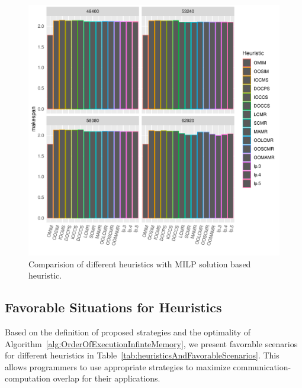 \documentclass[sigconf]{acmart}
\begin{document}
{\begin{figure}[htb]
			\includegraphics[scale=0.5]{./results/makespan_with_lp.pdf}
			\caption{Comparision of different heuristics with MILP solution based heuristic.}
			\label{fig:iterativeLpSolution}
		\end{figure}
		
		\subsection{Favorable Situations for Heuristics}
		Based on the definition of proposed strategies and the optimality of Algorithm~\ref{alg:OrderOfExecutionInfinteMemory}, we present favorable scenarios for different heuristics in Table~\ref{tab:heuristicsAndFavorableScenarios}. This allows programmers to use appropriate strategies to maximize communication-computation overlap for their applications.
		
}
\end{document}
